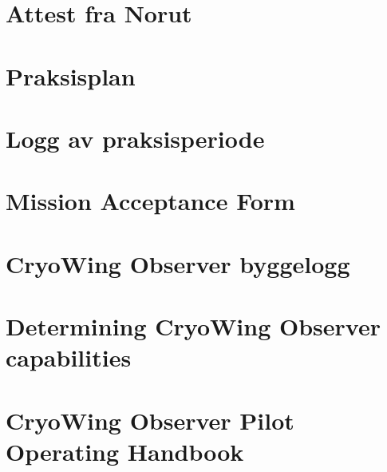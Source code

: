 \documentclass[12pt, a4paper]{article}
\begin{document}
\begin{appendices}
\vspace*{8cm} \centering \section{Attest fra Norut}

\vspace*{8cm} \centering \section{Praksisplan}

\vspace*{8cm} \centering \section{Logg av praksisperiode}

\vspace*{8cm} \centering \section{Mission Acceptance Form}

\vspace*{8cm} \centering \section{CryoWing Observer byggelogg}

\vspace*{8cm} \centering \section{Determining CryoWing Observer capabilities}

\vspace*{8cm} \centering \section{CryoWing Observer Pilot Operating Handbook}

\end{appendices}
\end{document}
